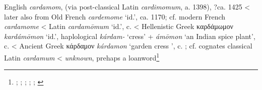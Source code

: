 \begin{etymology}\label{ety:cardamom}
English \textit{cardamom}, (via post-classical Latin \textit{cardimomum}, a. 1398), ?ca. 1425
< later also from Old French \textit{cardemome} `id.', ca. 1170; cf. modern French \textit{cardamome}
< Latin \textit{cardamōmum} `id.',  c. \AD{}
< Hellenistic Greek {καρδάμωμον} \textit{kardámōmon} `id.', haplological  \textit{kárdam-} `cress' +  \textit{ámōmon} `an Indian spice plant',  c. \BC{}
< Ancient Greek {κάρδαμον} \textit{kárdamon} `garden cress ',  c. \BC{}; cf. cognates classical Latin \textit{cardamum}
< \textit{unknown}, prehaps a loanword\footnote{\textcite[s.v. cardamom]{oed}; \textcite[s.v. cardamome]{tlfi}; \textcite[s.v. cardamomum]{lewis_latin_1879}; \textcite[s.v. καρδάμωμον]{liddell_greek-english_1940}; \textcite[s.v. κάρδαμον]{liddell_greek-english_1940}; \textcite[644]{beekes_etymological_2010}}
\end{etymology}